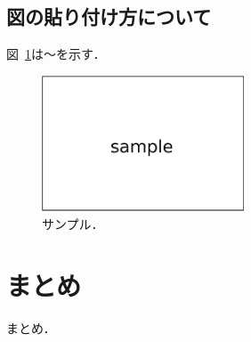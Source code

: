 \documentclass[10pt,a4paper,fleqn,dvipdfmx]{jsarticle}
\begin{document}
\subsection{図の貼り付け方について}

図~\ref{fig_sample}は〜を示す．

\begin{figure}[htb]
\begin{center}
\includegraphics[width=60mm]{sample.eps}
\caption{サンプル．}
\label{fig_sample}
\end{center}
\end{figure}


\section{まとめ}

まとめ．
\end{document}
